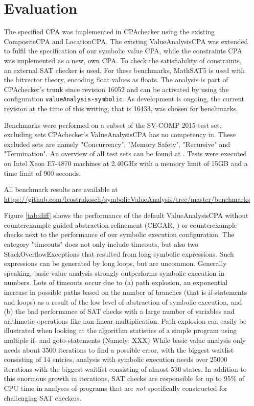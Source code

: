 \section{Evaluation}
The specified CPA was implemented in CPAchecker\cite{Beyer2011} using the existing CompositeCPA and LocationCPA.
The existing ValueAnalysisCPA  was extended to fulfil the specification of our symbolic value CPA,
while the constraints CPA was implemented as a new, own CPA. To check the satisfiability of constraints, an external SAT checker is used. For these benchmarks, MathSAT5 is used with the bitvector theory, encoding float values as floats.
The analysis is part of CPAchecker's trunk since revision 16052 and can be activated by using the configuration \texttt{valueAnalysis-symbolic}. As development is ongoing, the current revision at the time of this writing, that is 16433, was chosen for benchmarks.

Benchmarks were performed on a subset of the SV-COMP 2015 test set, excluding sets CPAchecker's ValueAnalysisCPA has no competency in.
These excluded sets are namely "Concurrency", "Memory Safety", "Recursive" and "Termination". An overview of all test sets can be found at \cite{SV15Tasks}.
Tests were executed on Intel Xeon E7-4870 machines at 2.40GHz with a memory limit of 15GB and a time limit of 900 seconds.

All benchmark results are available at \url{https://github.com/leostrakosch/symbolicValueAnalysis/tree/master/benchmarks}

Figure \ref{tab:diff} shows the performance of the default ValueAnalysisCPA without counterexample-guided abstraction refinement (CEGAR, \cite{Beyer2013}) or counterexample checks next to the performance of our symbolic execution configuration. The category "timeouts" does not only include timeouts, but also two StackOverflowExceptions that resulted from long symbolic expressions. Such expressions can be generated by long loops, but are uncommon.
Generally speaking, basic value analysis strongly outperforms symbolic execution in numbers.
Lots of timeouts occur due to
(a) path explosion, an exponential increase in possible paths based on the number of branches (that is if-statements and loops) as a result of the low level of abstraction of symbolic execution, and
(b) the bad performance of SAT checks with a large number of variables and arithmetic operations like non-linear multiplication.
Path explosion can easily be illustrated when looking at the algorithm statistics of a simple program using multiple if- and goto-statements (Namely: XXX)
While basic value analysis only needs about 3500 iterations to find a possible error, with the biggest waitlist consisting of 14 entries,
analysis with symbolic execution needs over 25000 iterations with the biggest waitlist consisting of almost 530 states.
In addition to this enormous growth in iterations, SAT checks are responsible for up to 95\% of CPU time in analyses of programs that are \emph{not} specifically constructed for challenging SAT checkers.


